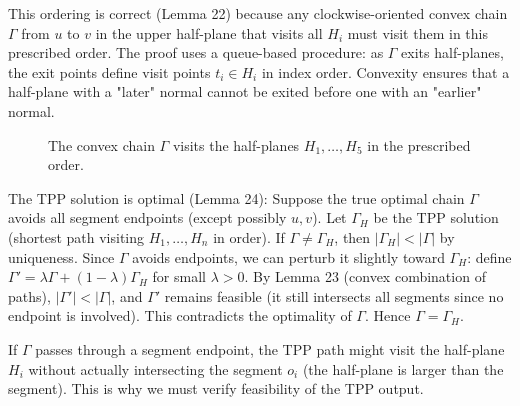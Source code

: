 \documentclass{article}
\begin{document}
This ordering is correct (Lemma 22) because any clockwise-oriented convex
chain $\Gamma$ from $u$ to $v$ in the upper half-plane that visits all $H_i$
must visit them in this prescribed order. The proof uses a queue-based
procedure: as $\Gamma$ exits half-planes, the exit points define visit points
$t_i \in H_i$ in index order. Convexity ensures that a half-plane with a
"later" normal cannot be exited before one with an "earlier" normal.
\begin{figure}[ht] \centering {} 
    \caption{ The convex chain $\Gamma$ visits the half-planes $H_1,\ldots,H_5$ in the prescribed order. } 
    \label{fig:tpp-reduction} 
\end{figure}


The TPP solution is optimal (Lemma 24): Suppose the true optimal
chain $\Gamma$ avoids all segment endpoints (except possibly $u, v$). Let
$\Gamma_H$ be the TPP solution (shortest path visiting $H_1, \ldots, H_n$ in
order). If $\Gamma \neq \Gamma_H$, then $|\Gamma_H| < |\Gamma|$ by uniqueness.
Since $\Gamma$ avoids endpoints, we can perturb it slightly toward $\Gamma_H$:
define $\Gamma' = \lambda \Gamma + (1-\lambda)\Gamma_H$ for small $\lambda > 0$.
By Lemma 23 (convex combination of paths), $|\Gamma'| < |\Gamma|$, and $\Gamma'$
remains feasible (it still intersects all segments since no endpoint is involved).
This contradicts the optimality of $\Gamma$. Hence $\Gamma = \Gamma_H$.

If $\Gamma$ passes through a segment
endpoint, the TPP path might visit the half-plane $H_i$ without actually
intersecting the segment $o_i$ (the half-plane is larger than the segment).
This is why we must verify feasibility of the TPP output.
\end{document}
